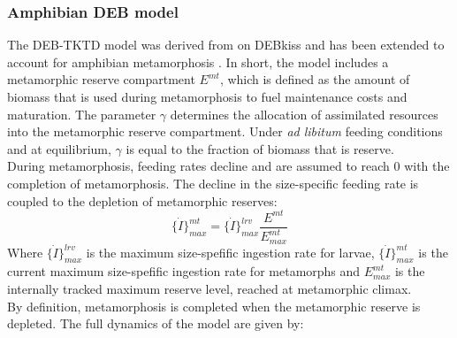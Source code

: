 \documentclass[utf8]{FrontiersinHarvard} %
\begin{document}
\subsubsection{Amphibian DEB model}
%
The DEB-TKTD model was derived from on DEBkiss \citep{jagerDEBkissQuestSimplest2013} 
and has been extended to account for amphibian metamorphosis \citep{hansulDynamicEnergyBudget2026}. 
In short, the model includes a metamorphic reserve compartment $E^{mt}$, 
which is defined as the amount of biomass that is used during metamorphosis to fuel 
maintenance costs and maturation. 
The parameter $\gamma$ determines the allocation of assimilated resources into the metamorphic reserve 
compartment. 
Under \textit{ad libitum} feeding conditions and at equilibrium, 
$\gamma$ is equal to the fraction of biomass that is reserve.\\
During metamorphosis, feeding rates decline and are assumed to reach 0 with the completion of metamorphosis. 
The decline in the size-specific feeding rate is coupled to the depletion of metamorphic reserves:
%
\begin{equation}
    \{ \dot{I} \}_{max}^{mt} = \{ \dot{I} \}_{max}^{lrv} \dfrac{E^{mt}}{E^{mt}_{max}}  
    \label{eq:dI_mt}
\end{equation}
%
Where  $\{ \dot{I} \}_{max}^{lrv}$ is the maximum size-spefific ingestion rate for larvae,
$\{ \dot{I} \}_{max}^{mt}$ is the current maximum size-spefific ingestion rate for metamorphs 
and $E^{mt}_{max}$ is the internally tracked maximum reserve level, 
reached at metamorphic climax.\\
By definition, metamorphosis is completed when the metamorphic reserve is depleted. 
The full dynamics of the model \citep{hansulDynamicEnergyBudget2026} are given by:
\end{document}

